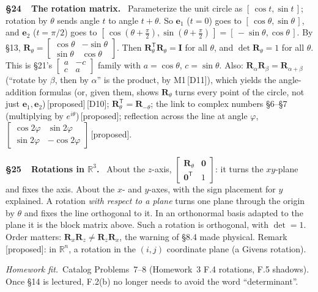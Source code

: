 \documentclass[11pt]{article}
\newcommand{\R}{\mathbb{R}}
\newcommand{\vc}[1]{\mathbf{#1}}
\newcommand{\mt}[1]{\mathbf{#1}}
\newcommand{\T}{^{\mathsf{T}}}
\newcommand{\prop}{\,{\color{ForestGreen}\sffamily\scriptsize[proposed]}}
\newcommand{\see}[1]{\,{\color{BrickRed}\sffamily\scriptsize[#1]}}
\newcommand{\sect}[2]{\par\smallskip\noindent\textbf{\S#1\ \ #2.}\ \ignorespaces}
\newcommand{\fits}{\par\smallskip\noindent\textit{Homework fit.}\ \ignorespaces}
\begin{document}
\sect{24}{The rotation matrix} Parameterize the unit circle as
$[\,\cos t,\sin t\,]$; rotation by $\theta$ sends angle $t$ to angle $t+\theta$.
So $\vc{e}_1$ ($t=0$) goes to $[\,\cos\theta,\sin\theta\,]$, and $\vc{e}_2$
($t=\pi/2$) goes to $[\,\cos(\theta+\frac{\pi}{2}),\sin(\theta+\frac{\pi}{2})\,]=[\,-\sin\theta,\cos\theta\,]$.
By \S13, $\mt{R}_\theta=\begin{bmatrix}\cos\theta&-\sin\theta\\\sin\theta&\cos\theta\end{bmatrix}$.
Then $\mt{R}_\theta\T\mt{R}_\theta=\mt{I}$ for all $\theta$, and
$\det\mt{R}_\theta=1$ for all $\theta$. This is \S21's
$\begin{bmatrix}a&-c\\c&a\end{bmatrix}$ family with $a=\cos\theta$,
$c=\sin\theta$. Also:
$\mt{R}_\alpha\mt{R}_\beta=\mt{R}_{\alpha+\beta}$ (``rotate by $\beta$, then
by $\alpha$'' is the product, by M1\see{D11}), which yields the
angle-addition formulas (or, given them, shows $\mt{R}_\theta$ turns every point of
the circle, not just $\vc{e}_1,\vc{e}_2$)\prop\see{D10}; $\mt{R}_\theta\T=\mt{R}_{-\theta}$; the
link to complex numbers \S6--\S7 (multiplying by $e^{i\theta}$)\prop; reflection
across the line at angle $\varphi$,
$\begin{bmatrix}\cos2\varphi&\sin2\varphi\\\sin2\varphi&-\cos2\varphi\end{bmatrix}$\prop.

\sect{25}{Rotations in $\R^{3}$} About the $z$-axis,
$\begin{bmatrix}\mt{R}_\theta&\vc{0}\\\vc{0}\T&1\end{bmatrix}$: it turns the
$xy$-plane and fixes the axis. About the $x$- and $y$-axes, with the sign
placement for $y$ explained. A rotation \emph{with respect to a plane} turns one
plane through the origin by $\theta$ and fixes the line orthogonal to it. In an
orthonormal basis adapted to the plane it is the block matrix above. Such a rotation is orthogonal,
with $\det=1$. Order matters: $\mt{R}_x\mt{R}_z\neq\mt{R}_z\mt{R}_x$, the
warning of \S8.4 made physical. Remark\prop: in $\R^{n}$, a rotation in the
$(i,j)$ coordinate plane (a Givens rotation).

\fits Catalog Problems~7--8 (Homework~3 F.4 rotations, F.5 shadows). Once
\S14 is lectured, F.2(b) no longer needs to avoid the word ``determinant''.
\end{document}
